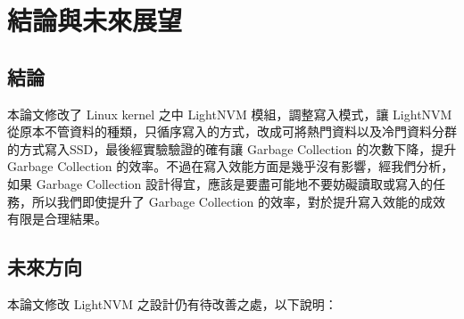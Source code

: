 \chapter{結論與未來展望}
\section{結論}
\indent
本論文修改了 Linux kernel 之中 LightNVM 模組，調整寫入模式，讓 LightNVM 從原本不管資料的種類，只循序寫入的方式，改成可將熱門資料以及冷門資料分群的方式寫入SSD，最後經實驗驗證的確有讓 Garbage Collection 的次數下降，提升 Garbage Collection 的效率。不過在寫入效能方面是幾乎沒有影響，經我們分析，如果 Garbage Collection 設計得宜，應該是要盡可能地不要妨礙讀取或寫入的任務，所以我們即使提升了 Garbage Collection 的效率，對於提升寫入效能的成效有限是合理結果。



\section{未來方向}
\indent
本論文修改 LightNVM 之設計仍有待改善之處，以下說明：


